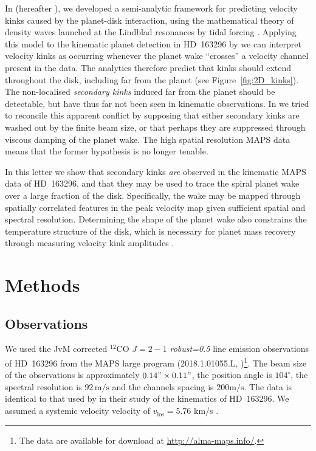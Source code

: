 In \citet{bollati2021} (hereafter ), we developed a semi-analytic framework for predicting velocity kinks caused by the planet-disk interaction, using the mathematical theory of density waves launched at the Lindblad resonances by tidal forcing \citep{goldreich1979,goldreich1980,goodman2001,ogilvie2002,rafikov2002a}.
Applying this model to the kinematic planet detection in HD~163296 by \citet{pinte2018a} we can interpret velocity kinks as occurring whenever the planet wake ``crosses'' a velocity channel present in the data.
The analytics therefore predict that kinks should extend throughout the disk, including far from the planet (see Figure~\ref{fig:2D_kinks}).
The non-localised \textit{secondary kinks} induced far from the planet should be detectable, but have thus far not been seen in kinematic observations.
In  we tried to reconcile this apparent conflict by supposing that either secondary kinks are washed out by the finite beam size, or that perhaps they are suppressed through viscous damping of the planet wake.
The high spatial resolution MAPS data means that the former hypothesis is no longer tenable.

In this letter we show that secondary kinks \textit{are} observed in the kinematic MAPS data of HD~163296, and that they may be used to trace the spiral planet wake over a large fraction of the disk.
Specifically, the wake may be mapped through spatially correlated features in the peak velocity map given sufficient spatial and spectral resolution.
Determining the shape of the planet wake also constrains the temperature structure of the disk, which is necessary for planet mass recovery through measuring velocity kink amplitudes .

\section{Methods}

\subsection{Observations}

We used the JvM corrected \citep{jorsater1995} $^{12}$CO $J=2-1$ \textit{robust=0.5} line emission observations of HD~163296 from the MAPS large program (2018.1.01055.L, \citealt{oberg2021,czekala2021})\footnote{The data are available for download at \url{http://alma-maps.info/}.}.
The beam size of the observations is approximately $0.14" \times 0.11"$, the position angle is $104^\circ$, the spectral resolution is $92 \, \mathrm{m/s}$ and the channels spacing is $200 \mathrm{m/s}$.
The data is identical to that used by \citet{teague2021} in their study of the kinematics of HD~163296.
We assumed a systemic velocity velocity of  $v_{\textrm{los}}= 5.76$ km/s \citep{teague2021}.

